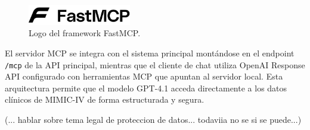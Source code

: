 \begin{figure}[H]
  \centering
  \includegraphics[width=0.4\textwidth]{imagenes/fastmpc.png}
  \caption{Logo del framework FastMCP.}
  \label{fig:fastmcp}
\end{figure}



El servidor MCP se integra con el sistema principal montándose en el endpoint \texttt{/mcp} de la API principal, mientras que el cliente de chat utiliza OpenAI Response API configurado con herramientas MCP que apuntan al servidor local. Esta arquitectura permite que el modelo GPT-4.1 acceda directamente a los datos clínicos de MIMIC-IV de forma estructurada y segura.








(... hablar sobre tema legal de proteccion de datos... todaviia no se si se puede...)

